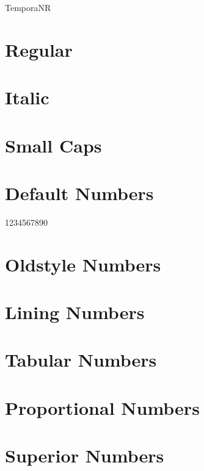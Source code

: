 \documentclass[a4paper]{article}
\begin{document}
\thispagestyle{empty}

\begin{center}\huge TemporaNR
\end{center}


\section*{Regular}
\lipsum[1]

\section*{Italic}
\textit{\lipsum[2]}

\section*{Small Caps}
\textsc{\lipsum[1]}

\section*{Default Numbers}

1234567890

\section*{Oldstyle Numbers}


\section*{Lining Numbers}


\section*{Tabular Numbers}


\section*{Proportional Numbers}


\section*{Superior Numbers}
\end{document}
